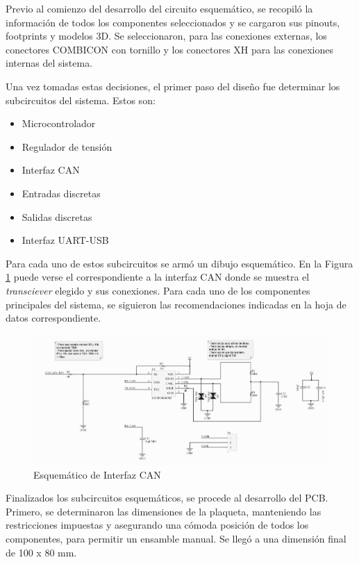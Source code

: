 Previo al comienzo del desarrollo del circuito esquemático, se recopiló la información de todos los componentes seleccionados y se cargaron sus pinouts, footprints y modelos 3D. Se seleccionaron, para las conexiones externas, los conectores COMBICON con tornillo y los conectores XH para las conexiones internas del sistema.

Una vez tomadas estas decisiones, el primer paso del diseño fue determinar los subcircuitos del sistema. Estos son:
\begin{itemize}
	\item Microcontrolador
	\item Regulador de tensión	
	\item Interfaz CAN
	\item Entradas discretas
	\item Salidas discretas
	\item Interfaz UART-USB
\end{itemize}

Para cada uno de estos subcircuitos se armó un dibujo esquemático. En la Figura \ref{fig:esquematico_can} puede verse el correspondiente a la interfaz CAN donde se muestra el \textit{transciever} elegido y sus conexiones. Para cada uno de los componentes principales del sistema, se siguieron las recomendaciones indicadas en la hoja de datos correspondiente. 

\begin{figure}[htbp]
	\centering
	\includegraphics[scale=.6]{./Figures/sch_can.JPG}
	\caption{Esquemático de Interfaz CAN}
	\label{fig:esquematico_can}
\end{figure}

Finalizados los subcircuitos esquemáticos, se procede al desarrollo del PCB. Primero, se determinaron las dimensiones de la plaqueta, manteniendo las restricciones impuestas y asegurando una cómoda posición de todos los componentes, para permitir un ensamble manual. Se llegó a una dimensión final de 100 x 80 mm. 

